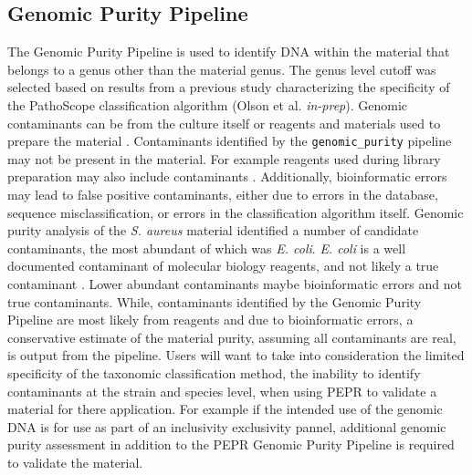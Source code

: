 \documentclass[smallextended]{svjour3}\usepackage[]{graphicx}\usepackage[]{color}
\begin{document}
\subsection{Genomic Purity Pipeline}
 The Genomic Purity Pipeline is used to identify DNA within the material that belongs to a genus other than the material genus.  The genus level cutoff was selected based on results from a previous study characterizing the specificity of the PathoScope classification algorithm (Olson et al. \textit{in-prep}). Genomic contaminants can be from the culture itself or reagents and materials used to prepare the material \cite{Shrestha2013, Tang2003, Salter2014}.  Contaminants identified by the \texttt{genomic\_purity} pipeline may not be present in the material. For example reagents used during library preparation may also include contaminants \cite{Tanner1998, Newsome2004, Motley2014, Salter2014}.  Additionally, bioinformatic errors may lead to false positive contaminants, either due to errors in the database, sequence misclassification, or errors in the classification algorithm itself.  Genomic purity analysis of the \textit{S. aureus} material identified a number of candidate contaminants,  the most abundant of which was \textit{E. coli}.  \textit{E. coli} is a well documented contaminant of molecular biology reagents, and not likely a true contaminant \cite{Salter2014}. Lower abundant contaminants maybe bioinformatic errors and not true contaminants. While, contaminants identified by the Genomic Purity Pipeline are most likely from reagents and due to bioinformatic errors, a conservative estimate of the material purity, assuming all contaminants are real, is output from the pipeline. Users will want to take into consideration the limited specificity of the taxonomic classification method, the inability to identify contaminants at the strain and species level, when using PEPR to validate a material for there application.  For example if the intended use of the genomic DNA is for use as part of an inclusivity exclusivity pannel, additional genomic purity assessment in addition to the PEPR Genomic Purity Pipeline is required to validate the material.
\end{document}
